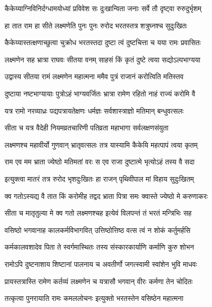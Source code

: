 \twolineshloka
{कैकेय्याग्निविनिर्दग्धामयोध्यां प्रविवेश सः}
{दुःखान्विता जनाः सर्वे तौ दृष्ट्वा रुरुदुर्भृशम्} %

\twolineshloka
{हा तात राम हा सीते लक्ष्मणेति पुनः पुनः}
{रुरोद भरतस्तत्र शत्रुघ्नश्च सुदुःखितः} %

\twolineshloka
{कैकेय्यास्तत्क्षणाच्छुत्वा चुक्रोध भरतस्तदा}
{दुष्टा त्वं दुष्टचित्ता च यया रामः प्रवासितः} %

\twolineshloka
{लक्ष्मणेन सह भ्रात्रा राघवः सीतया वनम्}
{साहसं किं कृतं दुष्टे त्वया सद्यो‍ऽल्पभाग्यया} %

\twolineshloka
{उद्वास्य सीतया रामं लक्ष्मणेन महात्मना}
{ममैव पुत्रं राजानं करोत्विति मतिस्तव} %

\twolineshloka
{दुष्टाया नष्टभाग्यायाः पुत्रोऽहं भाग्यवर्जितः}
{भ्रात्रा रामेण रहितो नाहं राज्यं करोमि वै} %

\twolineshloka
{यत्र रामो नरव्याध्रः पद्यपत्रायतेक्षणः}
{धर्मज्ञः सर्वशास्त्राज्ञो मतिमान् बन्धुवत्सलः} %

\twolineshloka
{सीता च यत्र वैदेही नियमव्रतचारिणी}
{पतिव्रता महाभागा सर्वलक्षणसंयुता} %

\twolineshloka
{लक्ष्मणश्च महावीर्यो गुणवान् भ्रातृवत्सलः}
{तत्र यास्यामि कैकेयि महत्पापं त्वया कृतम्} %

\twolineshloka
{राम एव मम भ्राता ज्येष्ठो मतिमतां वरः}
{स एव राजा दुष्टात्मे भृत्यो‍ऽहं तस्य वै सदा} %

\twolineshloka
{इत्युक्त्वा मातरं तत्र रुरोद भृशदुःखितः}
{हा राजन् पृथिवीपाल मां विहाय सुदुःखितम्} %

\twolineshloka
{क्व गतोऽस्यद्य वै तात किं करोमीह तद्वद}
{भ्राता पित्रा समः क्वास्ते ज्येष्ठो मे करुणाकरः} %

\twolineshloka
{सीता च मातृतुल्या मे क्व गतो लक्ष्मणश्चह}
{इत्येवं विलपन्तं तं भरतं मन्त्रिभिः सह} %

\twolineshloka
{वसिष्ठो भगवानाह कालकर्मविभागवित्}
{उत्तिष्ठोत्तिष्ठ वत्स त्वं न शोकं कर्तुमर्हसि} %

\twolineshloka
{कर्मकालवशादेव पिता ते स्वर्गमास्थितः}
{तस्य संस्कारकार्याणि कर्माणि कुरु शोभन} %

\twolineshloka
{रामोऽपि दुष्टनाशाय शिष्टानां पालनाय च}
{अवतीर्णो जगत्स्वामी स्वांशेन भुवि माधवः} %

\twolineshloka
{प्रायस्तत्रास्ति रामेण कर्तव्यं लक्ष्मणेन च}
{यत्रासौ भगवान् वीरः कर्मणा तेन चोदितः} %

\twolineshloka
{तत्कृत्वा पुनरायाति रामः कमललोचनः}
{इत्युक्तो भरतस्तेन वसिष्ठेन महात्मना} %

